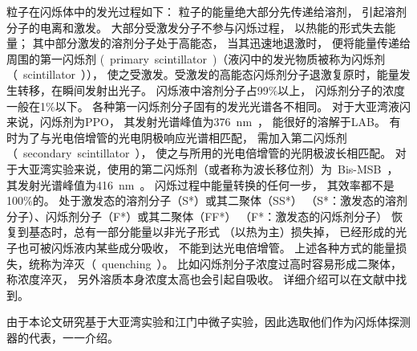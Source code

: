 粒子在闪烁体中的发光过程如下\citep{lakowicz2013principles}：
粒子的能量绝大部分先传递给溶剂，
引起溶剂分子的电离和激发。
大部分受激发分子不参与闪烁过程，
以热能的形式失去能量；
其中部分激发的溶剂分子处于高能态，
当其迅速地退激时，
便将能量传递给周围的第一闪烁剂 (~primary~scintillator~)（液闪中的发光物质被称为闪烁剂（~scintillator~）），
使之受激发。受激发的高能态闪烁剂分子退激复原时，能量发生转移，在瞬间发射出光子。
闪烁液中溶剂分子占99\%以上，
闪烁剂分子的浓度一般在1\%以下。
各种第一闪烁剂分子固有的发光光谱各不相同。
对于大亚湾液闪来说，闪烁剂为PPO，
其发射光谱峰值为376~nm~，
能很好的溶解于LAB。
有时为了与光电倍增管的光电阴极响应光谱相匹配，
需加入第二闪烁剂（~secondary~scintillator~），
使之与所用的光电倍增管的光阴极波长相匹配。
对于大亚湾实验来说，使用的第二闪烁剂（或者称为波长移位剂）为~Bis-MSB~，
其发射光谱峰值为416~nm~。
闪烁过程中能量转换的任何一步，
其效率都不是100\%的。
处于激发态的溶剂分子（S*）或其二聚体（SS*）
（S*：激发态的溶剂分子）、闪烁剂分子（F*）或其二聚体（FF*）
（F*：激发态的闪烁剂分子）
恢复到基态时，总有一部分能量以非光子形式
（以热为主）损失掉，
已经形成的光子也可被闪烁液内某些成分吸收，
不能到达光电倍增管。
上述各种方式的能量损失，统称为淬灭（~quenching~）。
比如闪烁剂分子浓度过高时容易形成二聚体，称浓度淬灭，
另外溶质本身浓度太高也会引起自吸收。
详细介绍可以在文献\citep{birks2013theory}中找到。

由于本论文研究基于大亚湾实验和江门中微子实验，因此选取他们作为闪烁体探测器的代表，一一介绍。

